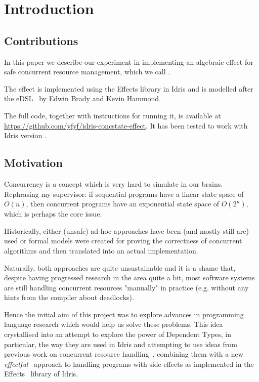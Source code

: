 \section{Introduction}

\subsection{Contributions}

In this paper we describe our experiment in implementing an algebraic effect
for safe concurrent resource management, which we call .

The effect is implemented using the Effects library in Idris and is modelled
after the  eDSL~\cite{cbconc-fi} by Edwin Brady and Kevin
Hammond.

The full code, together with instructions for running it, is available at
{\url{https://github.com/yfyf/idris-concstate-effect}}.
It has been tested to work with Idris version \version.

\subsection{Motivation}

Concurrency is a concept which is very hard to simulate in our brains.
Rephrasing my supervisor: if sequential programs have a linear state space of
$O(n)$, then concurrent programs have an exponential state space of $O(2^n)$,
which is perhaps the core issue.

Historically, either (unsafe) ad-hoc approaches have been (and mostly still
are) used or formal models were created for proving the correctness of
concurrent algorithms and then translated into an actual implementation.

Naturally, both approaches are quite unsustainable and it is a shame that,
despite having progressed research in the area quite a bit, most software
systems are still handling concurrent resources "manually" in practice (e.g.
without any hints from the compiler about deadlocks).

Hence the initial aim of this project was to explore advances in programming
language research which would help us solve these problems. This idea
crystallised into an attempt to explore the power of Dependent Types, in
particular, the way they are used in Idris and attempting to use ideas from
previous work on concurrent resource handling~\cite{cbconc-fi}, combining them
with a new \emph{effectful}~\cite{eff} approach to handling programs with side
effects as implemented in the Effects~\cite{effects-idr} library of Idris.

